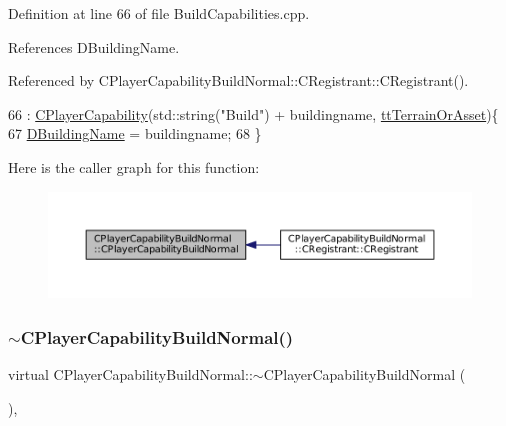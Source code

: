 Definition at line 66 of file Build\+Capabilities.\+cpp.



References D\+Building\+Name.



Referenced by C\+Player\+Capability\+Build\+Normal\+::\+C\+Registrant\+::\+C\+Registrant().


\begin{DoxyCode}
66                                                                                         : 
      \hyperlink{classCPlayerCapability_a303de62aba5d3f65d9a8e013c64a96c1}{CPlayerCapability}(std::string(\textcolor{stringliteral}{"Build"}) + buildingname, 
      \hyperlink{classCPlayerCapability_a9d3450ed1532fd536bd6cbb1e2eef02fa67cc6d11bc0aafc1b786bd6557ba4aa2}{ttTerrainOrAsset})\{
67     \hyperlink{classCPlayerCapabilityBuildNormal_aae09d6cee5f8e201a0139c9065a5577c}{DBuildingName} = buildingname;
68 \}
\end{DoxyCode}
Here is the caller graph for this function\+:\nopagebreak
\begin{figure}[H]
\begin{center}
\leavevmode
\includegraphics[width=350pt]{classCPlayerCapabilityBuildNormal_a36157bf1a2875f0831b646dd2313a464_icgraph}
\end{center}
\end{figure}
\hypertarget{classCPlayerCapabilityBuildNormal_aed39be621a98ed6d1aaf470cd5bf1ff5}{}\label{classCPlayerCapabilityBuildNormal_aed39be621a98ed6d1aaf470cd5bf1ff5} 
\subsubsection{\texorpdfstring{$\sim$\+C\+Player\+Capability\+Build\+Normal()}{~CPlayerCapabilityBuildNormal()}}
{\footnotesize\ttfamily virtual C\+Player\+Capability\+Build\+Normal\+::$\sim$\+C\+Player\+Capability\+Build\+Normal (\begin{DoxyParamCaption}{ }\end{DoxyParamCaption})\hspace{0.3cm}{\ttfamily [inline]}, {\ttfamily [virtual]}}



